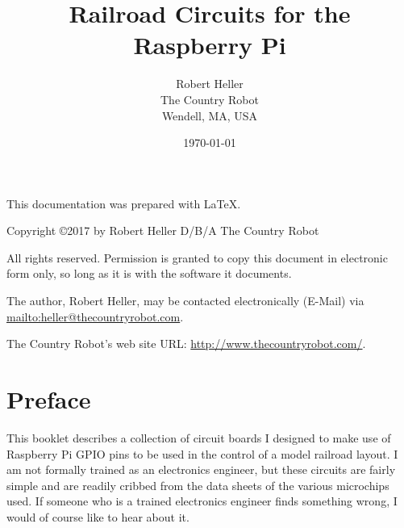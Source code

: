 \documentclass[12pt,notitlepage,twoside]{book}
\begin{document}
\title{Railroad Circuits for the Raspberry Pi}
\author{Robert Heller \\ The Country Robot \\ Wendell, MA, USA}
\date{\today}
\begin{titlepage}

\maketitle

\clearpage

This documentation was prepared with \LaTeX.

\vspace{.25in}


{\small Copyright \copyright 2017 by Robert Heller D/B/A The Country Robot}
\vspace{.25in}

All rights reserved.  Permission is granted to copy this document in
electronic form only, so long as it is with the software it
documents. 

\vspace{.125in}

The author, Robert Heller, may be contacted electronically (E-Mail) via
\url{mailto:heller@thecountryrobot.com}.

\vspace{.25in}

The Country Robot's web site URL: \url{http://www.thecountryrobot.com/}.

\thispagestyle{empty}
\setcounter{page}{0}
\clearpage

\end{titlepage}

\tableofcontents
\listoffigures
\listoftables
\cleardoublepage
\chapter*{Preface}

This booklet describes a collection of circuit boards I designed to make use 
of Raspberry Pi GPIO pins to be used in the control of a model railroad 
layout.  I am not formally trained as an electronics engineer, but these 
circuits are fairly simple and are readily cribbed from the data sheets of the 
various microchips used.  If someone who is a trained electronics engineer 
finds something wrong, I would of course like to hear about it.

\cleardoublepage
{}
\end{document}
